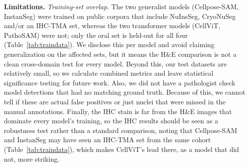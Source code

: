 \documentclass[10pt,conference]{IEEEtran}
\begin{document}
\textbf{Limitations.} \emph{Training-set overlap.} The two generalist models
(Cellpose-SAM, InstanSeg) were trained on public corpora that include NuInsSeg,
CryoNuSeg and/or an IHC-TMA set, whereas the two transformer models (CellViT,
PathoSAM) were not; only the oral set is held-out for all four
(Table~\ref{tab:traindata}). We disclose this per model and avoid claiming
generalization on the affected sets, but it means the H\&E comparison is not a
clean cross-domain test for every model. Beyond this, our test datasets are
relatively small, so we calculate combined metrics
and leave statistical significance testing for future work. Also, we did not have a pathologist
check model detections that had no matching ground truth. Because of this, we cannot tell if these
are actual false positives or just nuclei that were missed in the manual annotations. Finally, the
IHC stain is far from the H\&E images that dominate every model's training, so the IHC results
should be seen as a robustness test rather than a standard comparison, noting that Cellpose-SAM
and InstanSeg may have seen an IHC-TMA set from the same cohort (Table~\ref{tab:traindata}), which
makes CellViT's lead there, as a model that did not, more striking.

\end{document}
